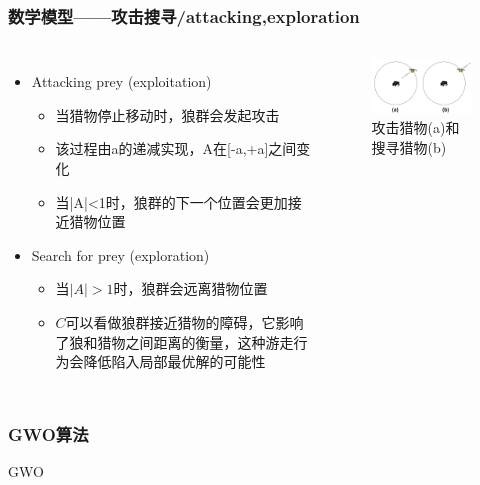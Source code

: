 \begin{frame}
	\frametitle{数学模型——攻击搜寻/attacking,exploration}
	\begin{columns}
		\begin{itemize}
			\item {Attacking prey (exploitation)}
				\begin{itemize}
					\item {当猎物停止移动时，狼群会发起攻击}
					\item {该过程由a的递减实现，A在[-a,+a]之间变化}
					\item {当|A|<1时，狼群的下一个位置会更加接近猎物位置}
				\end{itemize}
			\item {Search for prey (exploration)}
				\begin{itemize}
					\item {当$|A|>1$时，狼群会远离猎物位置}
					\item {$C$可以看做狼群接近猎物的障碍，它影响了狼和猎物之间距离的衡量，这种游走行为会降低陷入局部最优解的可能性}
				\end{itemize}
		\end{itemize}
		\begin{figure}[htbp]
			\centering
			\includegraphics[width=7cm]{pic/wolf5.png}
			\caption{攻击猎物(a)和搜寻猎物(b)}
		\end{figure}
	\end{columns}
\end{frame}


\begin{frame}
	\frametitle{GWO算法}
	\begin{algorithm}[H]
	\caption{GWO}\label{wolf_alg}
	 \scriptsize
		\begin{algorithmic}
				\ENDFOR
			\ENDWHILE
		\end{algorithmic}
	\end{algorithm}
\end{frame}

